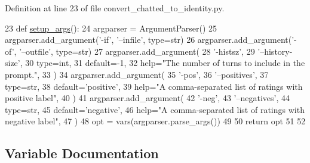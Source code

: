 Definition at line 23 of file convert\+\_\+chatted\+\_\+to\+\_\+identity.\+py.


\begin{DoxyCode}
23 \textcolor{keyword}{def }\hyperlink{namespaceprojects_1_1self__feeding_1_1scripts_1_1convert__chatted__to__identity_a2179caf1a41e96bb38cad058863084a3}{setup\_args}():
24     argparser = ArgumentParser()
25     argparser.add\_argument(\textcolor{stringliteral}{'-if'}, \textcolor{stringliteral}{'--infile'}, type=str)
26     argparser.add\_argument(\textcolor{stringliteral}{'-of'}, \textcolor{stringliteral}{'--outfile'}, type=str)
27     argparser.add\_argument(
28         \textcolor{stringliteral}{'-histsz'},
29         \textcolor{stringliteral}{'--history-size'},
30         type=int,
31         default=-1,
32         help=\textcolor{stringliteral}{"The number of turns to include in the prompt."},
33     )
34     argparser.add\_argument(
35         \textcolor{stringliteral}{'-pos'},
36         \textcolor{stringliteral}{'--positives'},
37         type=str,
38         default=\textcolor{stringliteral}{'positive'},
39         help=\textcolor{stringliteral}{"A comma-separated list of ratings with positive label"},
40     )
41     argparser.add\_argument(
42         \textcolor{stringliteral}{'-neg'},
43         \textcolor{stringliteral}{'--negatives'},
44         type=str,
45         default=\textcolor{stringliteral}{'negative'},
46         help=\textcolor{stringliteral}{"A comma-separated list of ratings with negative label"},
47     )
48     opt = vars(argparser.parse\_args())
49 
50     \textcolor{keywordflow}{return} opt
51 
52 
\end{DoxyCode}


\subsection{Variable Documentation}
\mbox{\label{namespaceprojects_1_1self__feeding_1_1scripts_1_1convert__chatted__to__identity_ac5c576d4b9952271c65abdbfab742c53}} 
